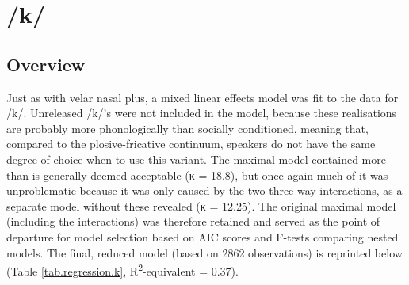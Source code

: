 \section{/k/}
\label{prod.res.con.k}

\subsection{Overview}
\label{sec.prod.res.con.k.overview}

Just as with velar nasal plus, a mixed linear effects model was fit to the data for /k/.
Unreleased /k/'s were not included in the model, because these realisations are probably more phonologically than socially conditioned, meaning that, compared to the plosive-fricative continuum, speakers do not have the same degree of choice when to use this variant.
The maximal model contained more  than is generally deemed acceptable (κ = 18.8), but once again much of it was unproblematic because it was only caused by the two three-way interactions, as a separate model without these revealed (κ = 12.25).
The original maximal model (including the interactions) was therefore retained and served as the point of departure for model selection based on AIC scores and F-tests comparing nested models.
The final, reduced model (based on 2862 observations) is reprinted below (Table \ref{tab.regression.k}, R\textsuperscript{2}-equivalent = 0.37).

